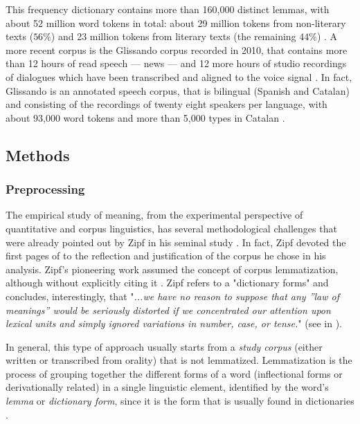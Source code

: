 \documentclass[10pt,letterpaper]{article}
\begin{document}
This frequency dictionary contains more than 160,000 distinct lemmas, with about 52 million word tokens in total: about 29 million tokens from non-literary texts ($56\%$) and 23 million tokens from literary texts (the remaining $44\%$) \cite{diccionari_1998}. A more recent corpus is the Glissando corpus recorded in 2010, that contains more than 12 hours of read speech — news — and 12 more hours of studio recordings of dialogues which have been transcribed and aligned to the voice signal \cite{garrido2013}. In fact, Glissando is an annotated speech corpus, that is bilingual (Spanish and Catalan) and consisting of the recordings of twenty eight speakers per language, with about 93,000 word tokens and more than 5,000 types in Catalan \cite{entropy2019, garrido2013}.

\subsection*{Methods}

\subsubsection*{Preprocessing}

The empirical study of meaning, from the experimental perspective of quantitative and corpus linguistics, has several methodological challenges that were already pointed out by Zipf in his seminal study \cite{Zipf_MFL}. 
In fact, Zipf devoted the first pages of \cite{Zipf_MFL} to the reflection and justification of the corpus he chose in his analysis. Zipf's pioneering work assumed the concept of corpus lemmatization, although without explicitly citing it \cite{Zipf1949, Zipf_MFL}. Zipf refers to a "dictionary forms" and concludes, interestingly, that "\textit{...we  have  no  reason  to  suppose  that  any  ”law  of  meanings”  would be seriously distorted if we concentrated our attention upon lexical units and simply ignored variations in number, case, or tense.}" (see in \cite[p. 29]{Zipf1949}).  

In general, this type of  approach usually starts from a \textit{study corpus} (either written or transcribed from orality) that is not lemmatized. Lemmatization is the process of grouping together the different forms of a word (inflectional forms or derivationally related) in a single linguistic element, identified by the word's \textit{lemma} or \textit{dictionary form}, since it is the form that is usually found in dictionaries \cite{manning2008_introduction}.
\end{document}
